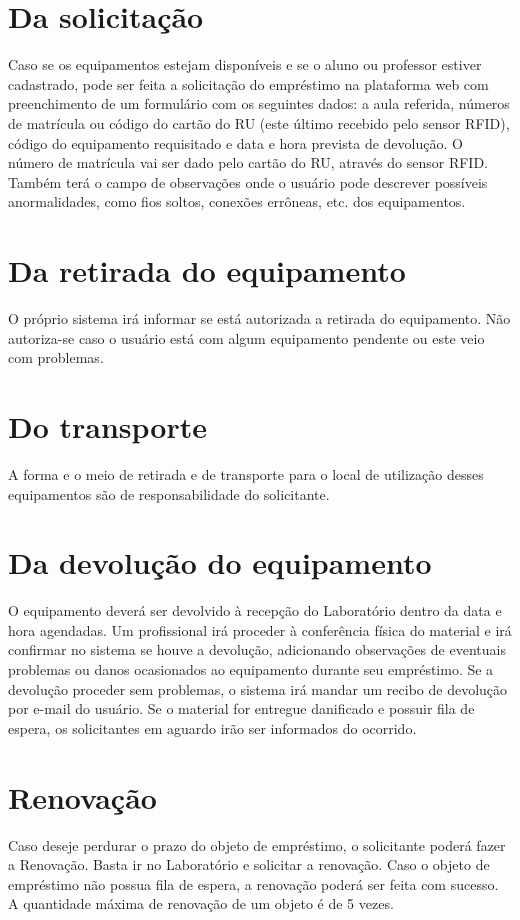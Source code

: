 \section[Da solicitação]{Da solicitação} 
Caso se os equipamentos estejam disponíveis e se o aluno ou professor estiver cadastrado, pode ser feita a solicitação do empréstimo na plataforma web com preenchimento de um formulário com os seguintes dados: a aula referida, números de matrícula ou código do cartão do RU (este último recebido pelo sensor RFID), código do equipamento requisitado e data e hora prevista de devolução. O número de matrícula vai ser dado pelo cartão do RU, através do sensor RFID. Também terá o campo de observações onde o usuário pode descrever possíveis anormalidades, como fios soltos, conexões errôneas, etc. dos equipamentos.
\section[Da retirada do equipamento]{Da retirada do equipamento} 
O próprio sistema irá informar se está autorizada a retirada do equipamento. Não autoriza-se caso o usuário está com algum equipamento pendente ou este veio com problemas.
\section[Do transporte]{Do transporte} 
A forma e o meio de retirada e de transporte para o local de utilização desses equipamentos são de responsabilidade do solicitante. 
\section[Da devolução do equipamento]{Da devolução do equipamento} 
O equipamento deverá ser devolvido à recepção do Laboratório dentro da data e hora agendadas.  Um profissional irá proceder à conferência física do material e irá confirmar no sistema se houve a devolução, adicionando observações de eventuais problemas ou danos ocasionados ao equipamento durante seu empréstimo. Se a devolução proceder sem problemas, o sistema irá mandar um recibo de devolução por e-mail do usuário.
Se o material for entregue danificado e possuir fila de espera, os solicitantes em aguardo irão ser informados do ocorrido. 
\section[Renovação]{Renovação} 
Caso deseje perdurar o prazo do objeto de empréstimo, o solicitante poderá fazer a Renovação. Basta ir no Laboratório e solicitar a renovação. Caso o objeto de empréstimo não possua fila de espera, a renovação poderá ser feita com sucesso. A quantidade máxima de renovação de um objeto é de 5 vezes.
